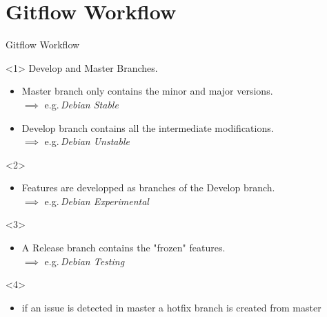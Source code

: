 \documentclass[usenames,dvipsnames,9pt]{beamer}
\begin{document}
%
%
\section{Gitflow Workflow}

%
\begin{frame}[t]{Gitflow Workflow}
  \begin{center}

    \begin{onlyenv}<1>
      Develop and Master Branches.
      \begin{itemize}
        \item Master branch only contains the minor and major versions.\\
        $\implies$ e.g.\,\emph{Debian Stable}
        \item Develop branch contains all the intermediate modifications.\\
        $\implies$ e.g.\,\emph{Debian Unstable}
      \end{itemize}
    \end{onlyenv}
    \begin{onlyenv}<2>
      \begin{itemize}
        \item Features are developped as branches of the Develop branch.\\
        $\implies$ e.g.\,\emph{Debian Experimental}
      \end{itemize}
    \end{onlyenv}
    \begin{onlyenv}<3>
      \begin{itemize}
        \item A Release branch contains the "frozen" features.\\
        $\implies$ e.g.\,\emph{Debian Testing}
      \end{itemize}
    \end{onlyenv}
    \begin{onlyenv}<4>
      \begin{itemize}
        \item if an issue is detected in master a hotfix branch is created from master
      \end{itemize}
    \end{onlyenv}
  \end{center}
\end{frame}
\end{document}
